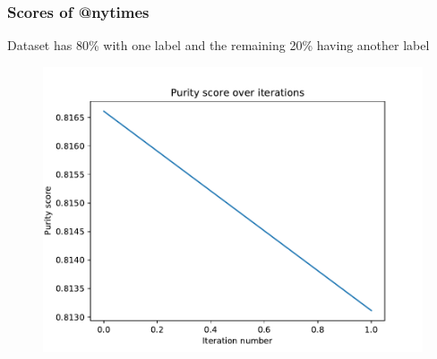 \documentclass{beamer}
\begin{document}
\begin{frame}[c]
    \frametitle{Scores of @nytimes}

    Dataset has 80\% with one label and the remaining 20\% having another label

    \begin{figure}[H]
        \centering
        \includegraphics[width=0.8\linewidth]{./out/nytimes_baseline200/purity_iterations.pdf}
    \end{figure}
\end{frame}
\end{document}
